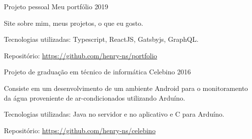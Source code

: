 \begin{cventries}
  \cventry
    {Projeto pessoal} %
    {Meu portfólio} %
    {} %
    {2019} %
    {
      \begin{cvitems} %
        \item {Site sobre mim, meus projetos, o que eu gosto.}
        \item {Tecnologias utilizadas: Typescript, ReactJS, Gatsbyjs, GraphQL.}
        \item {Repositório: \url{https://github.com/henry-ns/portfolio}}
      \end{cvitems}
    }  
  
  \cventry
    {Projeto de graduação em técnico de informática} %
    {Celebino} %
    {} %
    {2016} %
    {
      \begin{cvitems} %
        \item {Consiste em um desenvolvimento de um ambiente Android para o monitoramento da água proveniente de ar-condicionados utilizando Arduíno.}
        \item {Tecnologias utilizadas: Java no servidor e no aplicativo e C para Arduíno.}
        \item {Repositório: \url{https://github.com/henry-ns/celebino}}
      \end{cvitems}
    }
    

\end{cventries}